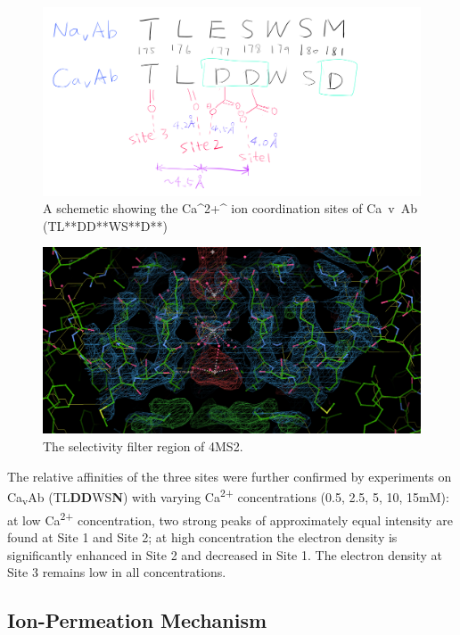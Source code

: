 \documentclass[
]{article}
\begin{document}
\begin{figure}
\includegraphics[width=1\linewidth]{../img/cavab-schematic} \caption{A schemetic showing the Ca^2+^ ion coordination sites of Ca~v~Ab (TL**DD**WS**D**)}\label{fig:cavab-schematic}
\end{figure}

\begin{figure}
\includegraphics[width=1\linewidth]{../img/coot-4ms2} \caption{The selectivity filter region of 4MS2.}\label{fig:coot-4ms2}
\end{figure}

The relative affinities of the three sites were further confirmed by experiments on Ca\textsubscript{v}Ab (TL\textbf{DD}WS\textbf{N}) with varying Ca\textsuperscript{2+} concentrations (0.5, 2.5, 5, 10, 15mM): at low Ca\textsuperscript{2+} concentration, two strong peaks of approximately equal intensity are found at Site 1 and Site 2; at high concentration the electron density is significantly enhanced in Site 2 and decreased in Site 1. The electron density at Site 3 remains low in all concentrations.

\hypertarget{ion-permeation-mechanism}{%
\subsection{Ion-Permeation Mechanism}\label{ion-permeation-mechanism}}
\end{document}
